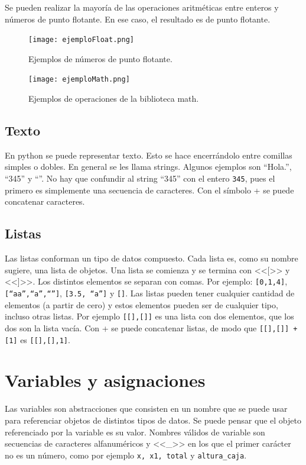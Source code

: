 \documentclass[a4paper, 12pt]{report}
\theoremstyle{definition}
\begin{document}
Se pueden realizar la mayoría de las operaciones aritméticas entre enteros y números de punto flotante. En ese caso, el resultado es de punto flotante.

\begin{figure}
	\centering
	\texttt{[image: ejemploFloat.png]}
	\caption{Ejemplos de números de punto flotante.}
	\label{fig-ejemploFloat}
\end{figure}

\begin{figure}
	\centering
	\texttt{[image: ejemploMath.png]}
	\caption{Ejemplos de operaciones de la biblioteca math.}
	\label{fig-ejemploMath}
\end{figure}


\subsection{Texto}

En python se puede representar texto. Esto se hace encerrándolo entre comillas simples o dobles. En general se les llama strings. Algunos ejemplos son ``Hola.'', ``345'' y ``''. No hay que confundir al string ``345'' con el entero {\tt 345}, pues el primero es simplemente una secuencia de caracteres. Con el símbolo + se puede concatenar caracteres.

\subsection{Listas}

Las listas conforman un tipo de datos compuesto. Cada lista es, como su nombre sugiere, una lista de objetos. Una lista se comienza y se termina con <<[>> y <<]>>. Los distintos elementos se separan con comas. Por ejemplo: {\tt[0,1,4]}, {\tt[``aa'',``a'',``'']}, {\tt [3.5, ``a'']} y {\tt[]}. Las listas pueden tener cualquier cantidad de elementos (a partir de cero) y estos elementos pueden ser de cualquier tipo, incluso otras listas. Por ejemplo {\tt [[],[]]} es una lista con dos elementos, que los dos son la lista vacía. Con + se puede concatenar listas, de modo que {\tt [[],[]] + [1]} es {\tt [[],[],1]}.


\section{Variables y asignaciones}

Las variables son abstracciones que consisten en un nombre que se puede usar para referenciar objetos de distintos tipos de datos. Se puede pensar que el objeto referenciado por la variable es su valor. Nombres válidos de variable son secuencias de caracteres alfanuméricos y <<\_>> en los que el primer carácter no es un número, como por ejemplo {\tt x, x1, total} y {\tt altura\_caja}.
\end{document}
